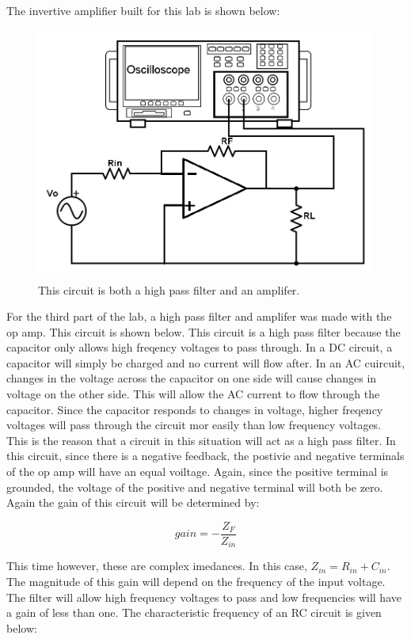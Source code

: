 \documentclass[twocolumn, amsmath]{revtex4}
\begin{document}
The invertive amplifier built for this lab is shown below:

\begin{figure}[h]
    \includegraphics[scale=0.4]{inverting.png}  
    \caption{This circuit is both a high pass filter and an amplifer.}
\end{figure}

For the third part of the lab, a high pass filter and amplifer was made with the op amp. This circuit is shown below. This circuit is a high pass filter because the capacitor only allows high freqency voltages to pass through. In a DC circuit, a capacitor will simply be charged and no current will flow after. In an AC cuircuit, changes in the voltage across the capacitor on one side will cause changes in voltage on the other side. This will allow the AC current to flow through the capacitor. Since the capacitor responds to changes in voltage, higher freqency voltages will pass through the circuit mor easily than low frequency voltages. This is the reason that a circuit in this situation will act as a high pass filter. In this circuit, since there is a negative feedback, the postivie and negative terminals of the op amp will have an equal voiltage. Again, since the positive terminal is grounded, the voltage of the positive and negative terminal will both be zero. Again the gain of this circuit will be determined by:

\begin{equation}
gain =  -\frac{Z_{F}}{Z_{in}}
\end{equation}

This time however, these are complex imedances. In this case, $Z_{in} = R_{in} + C_{in}$. The magnitude of this gain will depend on the frequency of the input voltage. The filter will allow high frequency voltages to pass and low frequencies will have a gain of less than one. The characteristic frequency of an RC circuit is given below:
\end{document}
